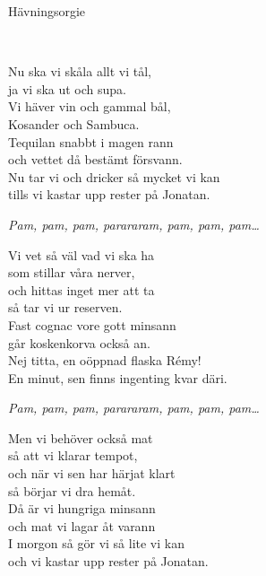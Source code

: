 \begin{song}{Hävningsorgie}

	
	\\
	
	Nu ska vi skåla allt vi tål,\\
	ja vi ska ut och supa.\\
	Vi häver vin och gammal bål,\\
	Kosander och Sambuca.\\
	Tequilan snabbt i magen rann\\
	och vettet då bestämt försvann.\\
	Nu tar vi och dricker så mycket vi kan\\
	tills vi kastar upp rester på Jonatan.
	
	\emph{Pam, pam, pam, parararam, pam, pam, pam\dots}
	
	Vi vet så väl vad vi ska ha\\
	som stillar våra nerver,\\
	och hittas inget mer att ta\\
	så tar vi ur reserven.\\
	Fast cognac vore gott minsann\\
	går koskenkorva också an.\\
	Nej titta, en oöppnad flaska Rémy!\\
	En minut, sen finns ingenting kvar däri.
	
	\emph{Pam, pam, pam, parararam, pam, pam, pam\dots}
	
	Men vi behöver också mat\\
	så att vi klarar tempot,\\
	och när vi sen har härjat klart\\
	så börjar vi dra hemåt.\\
	Då är vi hungriga minsann\\
	och mat vi lagar åt varann\\
	I morgon så gör vi så lite vi kan\\
	och vi kastar upp rester på Jonatan.


	
\end{song}
